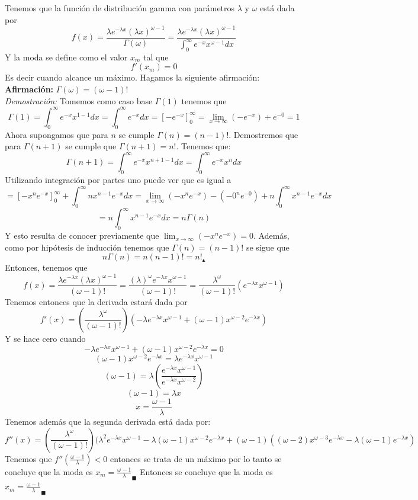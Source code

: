 \documentclass[11pt,a4paper]{report}
\begin{document}
\begin{enumerate}
{\begin{enumerate}
{				
				Tenemos que la función de distribución gamma con parámetros $\lambda$ y $\omega$ está dada por 
				$$f(x)=\frac{\lambda e^{-\lambda x}(\lambda x)^{\omega-1}}{\Gamma(\omega)}=\frac{\lambda e^{-\lambda x}(\lambda x)^{\omega -1}}{\int_{0}^{\infty}e^{-x}x^{\omega -1}dx}$$ Y la moda se define como el valor $x_{m}$ tal que $$f'(x_{m})=0$$
				Es decir cuando alcance un máximo. Hagamos la siguiente afirmación:\\
				\textbf{Afirmación:} $\Gamma(\omega)=(\omega-1)!$ \\
				\textit{Demostración:} Tomemos como caso base $\Gamma(1)$ tenemos que $$\Gamma(1)=\int_{0}^{\infty}e^{-x}x^{1-1}dx=\int_{0}^{\infty}e^{-x}dx=[-e^{-x}]_{0}^{\infty}=\lim_{x\rightarrow \infty}(-e^{-x})+e^{-0}=1$$ 
				Ahora supongamos que para $n$ se cumple $\Gamma(n)=(n-1)!$. Demostremos que para $\Gamma(n+1)$ se cumple que $\Gamma(n+1)=n!$. Tenemos que: $$\Gamma(n+1)=\int_{0}^{\infty}e^{-x}x^{n+1-1}dx=\int_{0}^{\infty}e^{-x}x^{n}dx$$ Utilizando integración por partes uno puede ver que es igual a $$=[-x^{n}e^{-x}]_{0}^{\infty}+\int_{0}^{\infty}n  x^{n-1}e^{-x}dx=\lim_{x\rightarrow \infty}(-x^n e^{-x})-(-0^{n} e^{-0})+n\int_{0}^{\infty}x^{n-1}e^{-x}dx$$ $$=n\int_{0}^{\infty}x^{n-1}e^{-x}dx=n\Gamma(n)$$
				Y esto resulta de conocer previamente que $\lim_{x \rightarrow \infty}(-x^{n}e^{-x})=0$. Además, como por hipótesis de inducción tenemos que $\Gamma(n)=(n-1)!$ se sigue que $$n\Gamma(n)=n(n-1)!=n!_{\blacktriangle}$$ Entonces, tenemos que $$f(x)=\frac{\lambda e^{-\lambda x}(\lambda x)^{\omega-1}}{(\omega-1)!}=\frac{(\lambda)^{\omega}e^{-\lambda x}x^{\omega-1}}{(\omega-1)!}=\frac{\lambda^{\omega}}{(\omega-1)!}(e^{-\lambda x}x^{\omega-1})$$ Tenemos entonces que la derivada estará dada por $$f'(x)=(\frac{\lambda^{\omega}}{(\omega-1)!}) (-\lambda e^{-\lambda x}x^{\omega-1}+(\omega-1)x^{\omega-2}e^{-\lambda x})$$ Y se hace cero cuando $$ -\lambda e^{-\lambda x}x^{\omega-1}+(\omega-1)x^{\omega-2}e^{-\lambda x}=0$$ $$(\omega-1)x^{\omega-2} e^{-\lambda x}=\lambda e^{-\lambda x}x^{\omega-1}$$ $$(\omega-1)=\lambda (\frac{e^{-\lambda x} x^{\omega-1}}{e^{-\lambda x}x^{\omega-2}})$$ $$(\omega-1)=\lambda x$$ $$x=\frac{\omega-1}{\lambda}$$
	Tenemos además que la segunda derivada está dada por: 
				$$f''(x)=(\frac{\lambda^{\omega}}{(\omega-1)!})(\lambda^2 e^{-\lambda x}x^{\omega-1}-\lambda(\omega-1)x^{\omega-2}e^{-\lambda x}+(\omega-1)((\omega-2)x^{\omega-3}e^{-\lambda x}-\lambda(\omega-1)e^{-\lambda x})$$
				Tenemos que $f''(\frac{\omega-1}{\lambda})<0$ entonces se trata de un máximo por lo tanto se concluye que la moda es $x_{m}=\frac{\omega-1}{\lambda}_{\blacksquare}$
				Entonces se concluye que la moda es $x_{m}=\frac{\omega-1}{\lambda}_{\blacksquare}$
				}


\end{enumerate}}
\end{enumerate}
\end{document}
